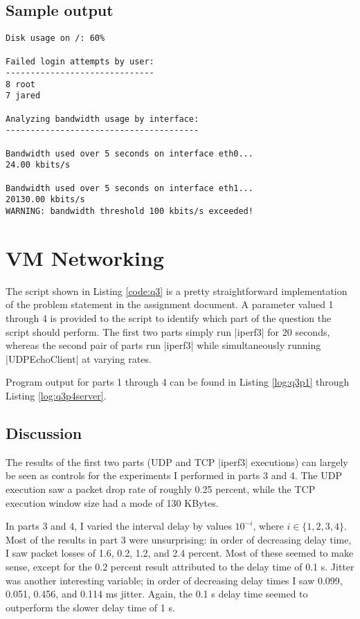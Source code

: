 \documentclass{article}
\begin{document}
\subsection{Sample output}

\begin{lstlisting}
Disk usage on /: 60%

Failed login attempts by user:
------------------------------
8 root
7 jared

Analyzing bandwidth usage by interface:
---------------------------------------

Bandwidth used over 5 seconds on interface eth0...
24.00 kbits/s

Bandwidth used over 5 seconds on interface eth1...
20130.00 kbits/s
WARNING: bandwidth threshold 100 kbits/s exceeded!
\end{lstlisting}

\section{VM Networking}

The script shown in Listing \ref{code:q3} is a pretty straightforward
implementation of the problem statement in the assignment document. A
parameter valued 1 through 4 is provided to the script to identify which part
of the question the script should perform. The first two parts simply run
|iperf3| for 20 seconds, whereas the second pair of parts run |iperf3| while
simultaneously running |UDPEchoClient| at varying rates.

Program output for parts 1 through 4 can be found in Listing \ref{log:q3p1}
through Listing \ref{log:q3p4server}.

\subsection{Discussion}

The results of the first two parts (UDP and TCP |iperf3| executions) can
largely be seen as controls for the experiments I performed in parts 3 and 4.
The UDP execution saw a packet drop rate of roughly 0.25 percent, while the
TCP execution window size had a mode of 130 KBytes.

In parts 3 and 4, I varied the interval delay by values $10^{-i}$, where $i
\in \{1,2,3,4\}$. Most of the results in part 3 were unsurprising: in order of
decreasing delay time, I saw packet losses of 1.6, 0.2, 1.2, and 2.4 percent.
Most of these seemed to make sense, except for the 0.2 percent result
attributed to the delay time of 0.1 s. Jitter was another interesting
variable; in order of decreasing delay times I saw 0.099, 0.051, 0.456, and
0.114 ms jitter. Again, the 0.1 s delay time seemed to outperform the slower
delay time of 1 s.
\end{document}

